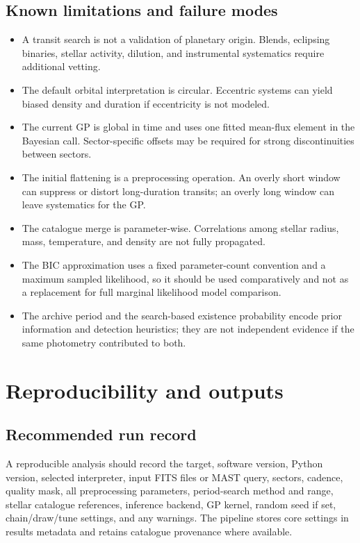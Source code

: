 \documentclass[12pt,a4paper,oneside]{report}
\begin{document}
\section{Known limitations and failure modes}
\begin{itemize}
  \item A transit search is not a validation of planetary origin. Blends,
        eclipsing binaries, stellar activity, dilution, and instrumental systematics
        require additional vetting.
  \item The default orbital interpretation is circular. Eccentric systems can
        yield biased density and duration if eccentricity is not modeled.
  \item The current GP is global in time and uses one fitted mean-flux element
        in the Bayesian call. Sector-specific offsets may be required for strong
        discontinuities between sectors.
  \item The initial flattening is a preprocessing operation. An overly short
        window can suppress or distort long-duration transits; an overly long
        window can leave systematics for the GP.
  \item The catalogue merge is parameter-wise. Correlations among stellar
        radius, mass, temperature, and density are not fully propagated.
  \item The BIC approximation uses a fixed parameter-count convention and a
        maximum sampled likelihood, so it should be used comparatively and not
        as a replacement for full marginal likelihood model comparison.
  \item The archive period and the search-based existence probability encode
        prior information and detection heuristics; they are not independent
        evidence if the same photometry contributed to both.
\end{itemize}

\chapter{Reproducibility and outputs}
\section{Recommended run record}
A reproducible analysis should record the target, software version, Python
version, selected interpreter, input FITS files or MAST query, sectors, cadence,
quality mask, all preprocessing parameters, period-search method and range,
stellar catalogue references, inference backend, GP kernel, random seed if set,
chain/draw/tune settings, and any warnings. The pipeline stores core settings in
results metadata and retains catalogue provenance where available.
\end{document}
